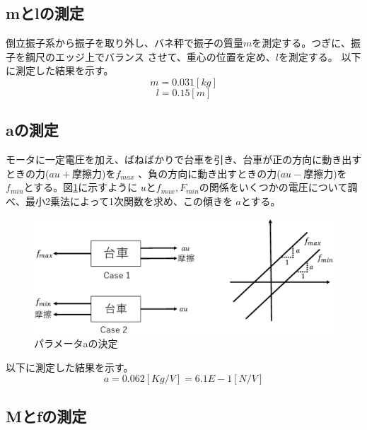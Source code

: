 \subsection{mとlの測定}
	倒立振子系から振子を取り外し、バネ秤で振子の質量$m$を測定する。つぎに、振子を鋼尺のエッジ上でバランス
	させて、重心の位置を定め、$l$を測定する。
	以下に測定した結果を示す。
	\[m = 0.031[kg]\]
	\[l = 0.15[m]\]
\subsection{aの測定}
	モータに一定電圧を加え、ばねばかりで台車を引き、台車が正の方向に動き出すときの力($au+摩擦力$)を$f_{max}$
	、負の方向に動き出すときの力($au-摩擦力$)を$f_{min}$とする。図\ref{image:parameterA}に示すように
	$u$と$f_{max},F_{min}$の関係をいくつかの電圧について調べ、最小2乗法によって1次関数を求め、この傾きを
	$a$とする。
	\begin{figure}[H]
		\centering
		\includegraphics[width=1.0\linewidth]{gazo/ParameterA.eps}
		\caption{パラメータaの決定}
		\label{image:parameterA}
	\end{figure}
	以下に測定した結果を示す。
	\[a=0.062[Kg/V] = 6.1E-1[N/V]\]
\subsection{Mとfの測定}
	
